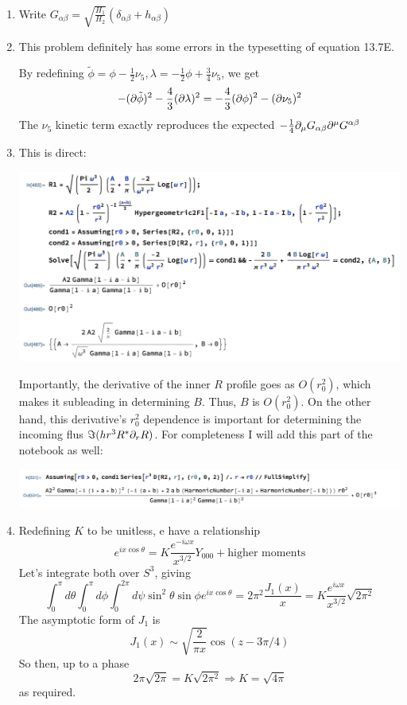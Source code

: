 \documentclass[11pt, class=article, crop=false]{standalone}
\begin{document}
\begin{enumerate}
	\item Write $G_{\alpha \beta} = \sqrt{\frac{H_1}{H_2}} (\delta_{\alpha \beta} + h_{\alpha \beta})$
	
	
	\item This problem definitely has some errors in the typesetting of equation 13.7E. 
	
	By redefining $\tilde \phi = \phi-\frac12 \nu_5, \lambda = -\frac12 \phi + \frac34 \nu_5$, we get
	\[
		- (\partial \tilde \phi)^2 - \frac43 (\partial \lambda)^2 = - \frac43 (\partial \phi)^2 - (\partial \nu_5)^2
	\]
	The $\nu_5$ kinetic term exactly reproduces the expected $-\frac14 \partial_\mu G_{\alpha \beta} \partial^\mu G^{\alpha \beta }$
	
	\item This is direct:
	\begin{center}
		\includegraphics[scale=0.5]{"Figures/BH Scattering"}
	\end{center}
	Importantly, the derivative of the inner $R$ profile goes as $O(r_0^2)$, which makes it subleading in determining $B$. Thus, $B$ is $O(r_0^2)$. On the other hand, this derivative's $r_0^2$ dependence is important for determining the incoming flus $\Im (h r^3 R^* \partial_r R)$. For completeness I will add this part of the notebook as well: 
	\begin{center}
		\includegraphics[scale=0.5]{"Figures/BH Scattering 2"}
	\end{center}
	
	\item Redefining $K$ to be unitless, e have a relationship 
	\[
		e^{i x \cos \theta} = K \frac{e^{- i \omega x}}{x^{3/2}} Y_{000} + \text{higher moments}
	\]
	Let's integrate both over $S^3$, giving
	\[
		\int_0^\pi d\theta \int_0^\pi d\phi \int_0^{2\pi} d\psi \sin^2 \theta  \sin \phi e^{i x \cos \theta} = 2 \pi^2 \frac{J_1(x)}{x}  = K \frac{e^{i \omega x}}{x^{3/2}} \sqrt{2 \pi^2}
	\]
	The asymptotic form of $J_1$ is
	\[
		J_1(x) \sim \sqrt{\frac{2}{\pi x}} \cos(z - 3 \pi /4)
	\]
	So then, up to a phase
	\[
		2 \pi \sqrt{2 \pi} = K \sqrt{2 \pi^2} \Rightarrow K = \sqrt{4 \pi}
	\]
	as required. 
	

\end{enumerate}
\end{document}
